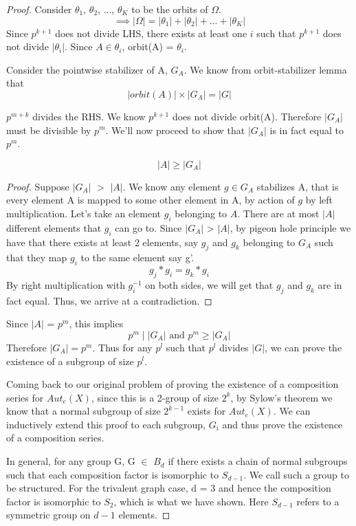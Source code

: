 \begin{proof}
Consider $\theta_{1}$, $\theta_{2}$, ..., $\theta_{K}$ to be the orbits of $\Omega$.
\[ \implies |\Omega| = |\theta_{1}| + |\theta_{2}| + ... + |\theta_{K}| \]
Since $p^{k+1}$ does not divide LHS, there exists at least one $i$ such that $p^{k+1}$ does not divide $|\theta_{i}|$. Since $A \in \theta_{i}$, orbit(A) = $\theta_{i}$.

Consider the pointwise stabilizer of A, $G_{A}$. We know from orbit-stabilizer lemma that
\[ |orbit(A)| \times |G_{A}| = |G| \]

$p^{m+k}$ divides the RHS. We know $p^{k+1}$ does not divide orbit(A). Therefore $|G_{A}|$ must be divisible by $p^{m}$. We'll now proceed to show that $|G_{A}|$ is in fact equal to $p^{m}$.

\begin{claim}
\[ |A| \geq |G_{A}| \]
\end{claim}

\begin{proof}
Suppose $|G_{A}|$ $>$ $|A|$. We know any element $g \in G_{A}$ stabilizes A, that is every element A is mapped to some other element in A, by action of $g$ by left multiplication. Let's take an element $g_{i}$ belonging to $A$. There are at most $|A|$ different elements that $g_{i}$ can go to. Since $|G_{A}|$ > $|A|$, by pigeon hole principle we have that there exists at least 2 elements, say $g_{j}$ and $g_{k}$ belonging to $G_{A}$ such that they map $g_{i}$ to the same element say g'.
\[ g_{j} * g_{i} = g_{k} * g_{i} \]
By right multiplication with $g_{i}^{-1}$ on both sides, we will get that $g_{j}$ and $g_{k}$ are in fact equal. Thus, we arrive at a contradiction.
\end{proof}

Since $|A|$ = $p^{m}$, this implies
\[ p^{m} \; | \; |G_{A}| \text{ and } p^m \geq |G_{A}| \]
Therefore $|G_{A}| = p^{m}$. Thus for any $p^{l}$ such that $p^{l}$ divides $|G|$, we can prove the existence of a subgroup of size $p^{l}$.

Coming back to our original problem of proving the existence of a composition series for $Aut_{e}(X)$, since this is a 2-group of size $2^{k}$, by Sylow's theorem we know that a normal subgroup of size $2^{k-1}$ exists for $Aut_{e}(X)$. We can inductively extend this proof to each subgroup, $G_{i}$ and thus prove the existence of a composition series.

In general, for any group G, G $\in$ $B_{d}$ if there exists a chain of normal subgroups such that each composition factor is isomorphic to $S_{d-1}$. We call such a group to be structured. For the trivalent graph case, d = 3 and hence the composition factor is isomorphic to $S_{2}$, which is what we have shown. Here $S_{d-1}$ refers to a symmetric group on $d - 1$ elements.
\end{proof}

